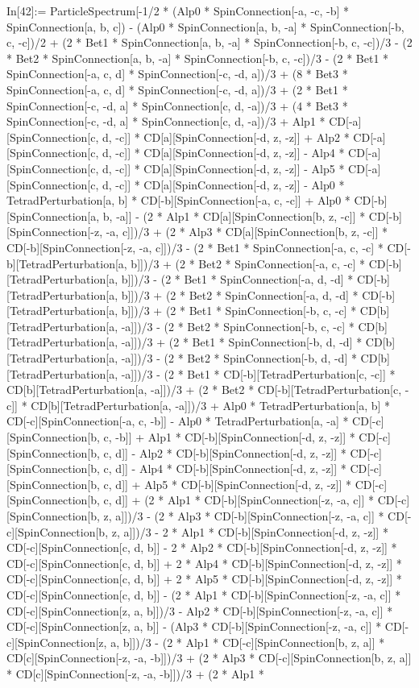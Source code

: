 In[42]:= ParticleSpectrum[-1/2 * (Alp0 * SpinConnection[-a, -c, -b] * SpinConnection[a, b, c]) - (Alp0 * SpinConnection[a, b, -a] * SpinConnection[-b, c, -c])/2 + (2 * Bet1 * SpinConnection[a, b, -a] * SpinConnection[-b, c, -c])/3 - (2 * Bet2 * SpinConnection[a, b, -a] * SpinConnection[-b, c, -c])/3 - (2 * Bet1 * SpinConnection[-a, c, d] * SpinConnection[-c, -d, a])/3 + (8 * Bet3 * SpinConnection[-a, c, d] * SpinConnection[-c, -d, a])/3 + (2 * Bet1 * SpinConnection[-c, -d, a] * SpinConnection[c, d, -a])/3 + (4 * Bet3 * SpinConnection[-c, -d, a] * SpinConnection[c, d, -a])/3 + Alp1 * CD[-a][SpinConnection[c, d, -c]] * CD[a][SpinConnection[-d, z, -z]] + Alp2 * CD[-a][SpinConnection[c, d, -c]] * CD[a][SpinConnection[-d, z, -z]] - Alp4 * CD[-a][SpinConnection[c, d, -c]] * CD[a][SpinConnection[-d, z, -z]] - Alp5 * CD[-a][SpinConnection[c, d, -c]] * CD[a][SpinConnection[-d, z, -z]] - Alp0 * TetradPerturbation[a, b] * CD[-b][SpinConnection[-a, c, -c]] + Alp0 * CD[-b][SpinConnection[a, b, -a]] - (2 * Alp1 * CD[a][SpinConnection[b, z, -c]] * CD[-b][SpinConnection[-z, -a, c]])/3 + (2 * Alp3 * CD[a][SpinConnection[b, z, -c]] * CD[-b][SpinConnection[-z, -a, c]])/3 - (2 * Bet1 * SpinConnection[-a, c, -c] * CD[-b][TetradPerturbation[a, b]])/3 + (2 * Bet2 * SpinConnection[-a, c, -c] * CD[-b][TetradPerturbation[a, b]])/3 - (2 * Bet1 * SpinConnection[-a, d, -d] * CD[-b][TetradPerturbation[a, b]])/3 + (2 * Bet2 * SpinConnection[-a, d, -d] * CD[-b][TetradPerturbation[a, b]])/3 + (2 * Bet1 * SpinConnection[-b, c, -c] * CD[b][TetradPerturbation[a, -a]])/3 - (2 * Bet2 * SpinConnection[-b, c, -c] * CD[b][TetradPerturbation[a, -a]])/3 + (2 * Bet1 * SpinConnection[-b, d, -d] * CD[b][TetradPerturbation[a, -a]])/3 - (2 * Bet2 * SpinConnection[-b, d, -d] * CD[b][TetradPerturbation[a, -a]])/3 - (2 * Bet1 * CD[-b][TetradPerturbation[c, -c]] * CD[b][TetradPerturbation[a, -a]])/3 + (2 * Bet2 * CD[-b][TetradPerturbation[c, -c]] * CD[b][TetradPerturbation[a, -a]])/3 + Alp0 * TetradPerturbation[a, b] * CD[-c][SpinConnection[-a, c, -b]] - Alp0 * TetradPerturbation[a, -a] * CD[-c][SpinConnection[b, c, -b]] + Alp1 * CD[-b][SpinConnection[-d, z, -z]] * CD[-c][SpinConnection[b, c, d]] - Alp2 * CD[-b][SpinConnection[-d, z, -z]] * CD[-c][SpinConnection[b, c, d]] - Alp4 * CD[-b][SpinConnection[-d, z, -z]] * CD[-c][SpinConnection[b, c, d]] + Alp5 * CD[-b][SpinConnection[-d, z, -z]] * CD[-c][SpinConnection[b, c, d]] + (2 * Alp1 * CD[-b][SpinConnection[-z, -a, c]] * CD[-c][SpinConnection[b, z, a]])/3 - (2 * Alp3 * CD[-b][SpinConnection[-z, -a, c]] * CD[-c][SpinConnection[b, z, a]])/3 - 2 * Alp1 * CD[-b][SpinConnection[-d, z, -z]] * CD[-c][SpinConnection[c, d, b]] - 2 * Alp2 * CD[-b][SpinConnection[-d, z, -z]] * CD[-c][SpinConnection[c, d, b]] + 2 * Alp4 * CD[-b][SpinConnection[-d, z, -z]] * CD[-c][SpinConnection[c, d, b]] + 2 * Alp5 * CD[-b][SpinConnection[-d, z, -z]] * CD[-c][SpinConnection[c, d, b]] - (2 * Alp1 * CD[-b][SpinConnection[-z, -a, c]] * CD[-c][SpinConnection[z, a, b]])/3 - Alp2 * CD[-b][SpinConnection[-z, -a, c]] * CD[-c][SpinConnection[z, a, b]] - (Alp3 * CD[-b][SpinConnection[-z, -a, c]] * CD[-c][SpinConnection[z, a, b]])/3 - (2 * Alp1 * CD[-c][SpinConnection[b, z, a]] * CD[c][SpinConnection[-z, -a, -b]])/3 + (2 * Alp3 * CD[-c][SpinConnection[b, z, a]] * CD[c][SpinConnection[-z, -a, -b]])/3 + (2 * Alp1 * 
